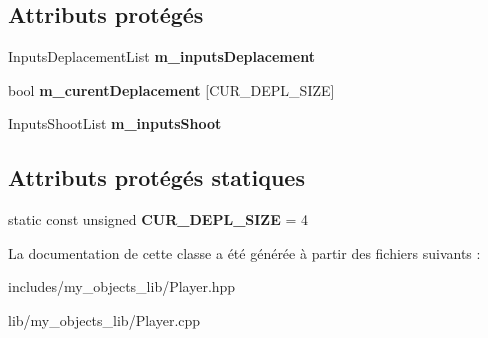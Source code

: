 \subsection*{Attributs protégés}
\begin{DoxyCompactItemize}
\item 
\mbox{\label{classmy_1_1Player_abcf5166fd66a8880260170131c8b4217}} 
Inputs\+Deplacement\+List {\bfseries m\+\_\+inputs\+Deplacement}
\item 
\mbox{\label{classmy_1_1Player_a07df7847fd8df42b9cf8dd44d54a4adb}} 
bool {\bfseries m\+\_\+curent\+Deplacement} \mbox{[}C\+U\+R\+\_\+\+D\+E\+P\+L\+\_\+\+S\+I\+ZE\mbox{]}
\item 
\mbox{\label{classmy_1_1Player_a5e16e49a2c01043e7ac8f17f6650a912}} 
Inputs\+Shoot\+List {\bfseries m\+\_\+inputs\+Shoot}
\end{DoxyCompactItemize}
\subsection*{Attributs protégés statiques}
\begin{DoxyCompactItemize}
\item 
\mbox{\label{classmy_1_1Player_a439c038202c48ec8aeeaa7dee6a307a2}} 
static const unsigned {\bfseries C\+U\+R\+\_\+\+D\+E\+P\+L\+\_\+\+S\+I\+ZE} = 4
\end{DoxyCompactItemize}


La documentation de cette classe a été générée à partir des fichiers suivants \+:\begin{DoxyCompactItemize}
\item 
includes/my\+\_\+objects\+\_\+lib/Player.\+hpp\item 
lib/my\+\_\+objects\+\_\+lib/Player.\+cpp\end{DoxyCompactItemize}
